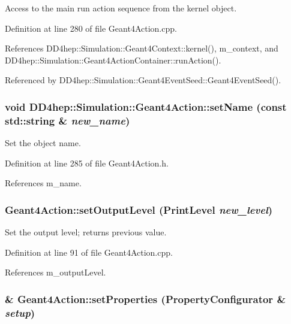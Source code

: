 Access to the main run action sequence from the kernel object. 

Definition at line 280 of file Geant4Action.cpp.

References DD4hep::Simulation::Geant4Context::kernel(), m\_\-context, and DD4hep::Simulation::Geant4ActionContainer::runAction().

Referenced by DD4hep::Simulation::Geant4EventSeed::Geant4EventSeed().\hypertarget{class_d_d4hep_1_1_simulation_1_1_geant4_action_a88c6c831673b3c152961079507056daa}{
\subsubsection[{setName}]{\setlength{\rightskip}{0pt plus 5cm}void DD4hep::Simulation::Geant4Action::setName (const std::string \& {\em new\_\-name})}}
\label{class_d_d4hep_1_1_simulation_1_1_geant4_action_a88c6c831673b3c152961079507056daa}


Set the object name. 

Definition at line 285 of file Geant4Action.h.

References m\_\-name.\hypertarget{class_d_d4hep_1_1_simulation_1_1_geant4_action_a20453f25c4556d21e25b68f140955cc3}{
\subsubsection[{setOutputLevel}]{ Geant4Action::setOutputLevel ({\bf PrintLevel} {\em new\_\-level})}}
\label{class_d_d4hep_1_1_simulation_1_1_geant4_action_a20453f25c4556d21e25b68f140955cc3}


Set the output level; returns previous value. 

Definition at line 91 of file Geant4Action.cpp.

References m\_\-outputLevel.\hypertarget{class_d_d4hep_1_1_simulation_1_1_geant4_action_af7cca1826781c1367ecc79c4225e09da}{
\subsubsection[{setProperties}]{ \& Geant4Action::setProperties ({\bf PropertyConfigurator} \& {\em setup})}}
\label{class_d_d4hep_1_1_simulation_1_1_geant4_action_af7cca1826781c1367ecc79c4225e09da}


